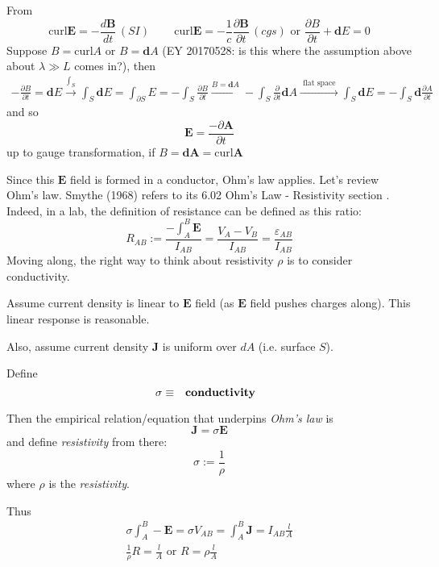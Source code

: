\documentclass[10pt]{amsart}
\begin{document}
\begin{multicols*}{2}
From 
\[
\text{curl} \mathbf{E} = -\frac{d\mathbf{B}}{dt} \, (SI) \qquad \, \text{curl}\mathbf{E} = -\frac{1}{c} \frac{ \partial \mathbf{B}}{ \partial t} \, (cgs) \text{ or } \frac{ \partial B}{ \partial t} + \mathbf{d}E = 0 
\]
Suppose $B = \text{curl} A$ or $B=\mathbf{d}A$ (EY 20170528: is this where the assumption above about $\lambda \gg L$ comes in?), then
\[
\begin{gathered}
	-\frac{\partial B}{ \partial t} = \mathbf{d}E \xrightarrow{ \int_S } \int_S \mathbf{d}E = \int_{ \partial S} E = -\int_S \frac{ \partial B}{ \partial t} \xrightarrow{ B = \mathbf{d}A } -\int_S \frac{ \partial }{ \partial t} \mathbf{d}A \xrightarrow{ \text{ flat space } } \int_S \mathbf{d}E = -\int_S \mathbf{d} \frac{ \partial A}{ \partial t}	
\end{gathered}
\]
and so
\begin{equation}
	\mathbf{E} = \frac{-\partial \mathbf{A}}{ \partial t}
\end{equation}
up to gauge transformation, if $B = \mathbf{d}\mathbf{A} = \text{curl}\mathbf{A}$

Since this $\mathbf{E}$ field is formed in a conductor, Ohm's law applies.  Let's review Ohm's law.  Smythe (1968) refers to its 6.02 Ohm's Law - Resistivity section \cite{Smyt1968}.  Indeed, in a lab, the definition of resistance can be defined as this ratio:
\begin{equation}
R_{AB} := \frac{ -\int_A^B \mathbf{E} }{ I_{AB} } = \frac{ V_A- V_B}{ I_{AB} } = \frac{ \varepsilon_{AB} }{ I_{AB} }
\end{equation}
Moving along, the right way to think about resistivity $\rho$ is to consider conductivity.  

Assume current density is linear to $\mathbf{E}$ field (as $\mathbf{E}$ field pushes charges along).  This linear response is reasonable.  

Also, assume current density $\mathbf{J}$ is uniform over $dA$ (i.e. surface $S$).  

Define 
\begin{equation}
\sigma \equiv \text{ \textbf{ conductivity } }
\end{equation}

Then the empirical relation/equation that underpins \emph{Ohm's law} is 
\begin{equation}
\mathbf{J} = \sigma \mathbf{E}
\end{equation}
and define \emph{resistivity} from there:
\begin{equation}
\sigma := \frac{1}{\rho}
\end{equation}
where $\rho $ is the \emph{resistivity}. 

Thus
\[
\begin{gathered}
	\sigma \int_A^B -\mathbf{E} = \sigma V_{AB} = \int_A^B \mathbf{J} = I_{AB} \frac{l}{A} \\
\frac{1}{\rho} R = \frac{l}{A} \text{ or } \boxed{ R = \rho \frac{l}{A} }
\end{gathered}
\]




\end{multicols*}
\end{document}
